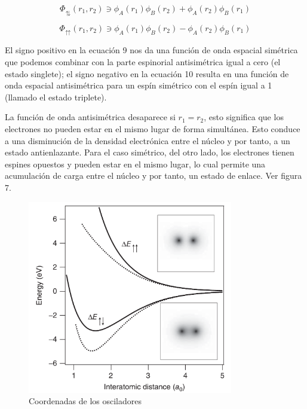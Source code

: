 \documentclass{article}
\begin{document}
\begin{equation}
    \Phi_{\updownarrows}(r_{1}, r_{2})\ni \phi_{A}(r_{1})\phi_{B}(r_{2}) + \phi_{A}(r_{2})\phi_{B}(r_{1})
\end{equation}

\begin{equation}
    \Phi_{\upuparrows}(r_{1}, r_{2})\ni \phi_{A}(r_{1})\phi_{B}(r_{2}) - \phi_{A}(r_{2})\phi_{B}(r_{1})
\end{equation}

El signo positivo en la ecuación 9 nos da una función de onda espacial simétrica que podemos combinar con la parte espinorial antisimétrica igual a cero (el estado singlete); el signo negativo en la ecuación 10 resulta en una función de onda espacial antisimétrica para un espín simétrico con el espín igual a 1 (llamado el estado triplete).

La función de onda antisimétrica desaparece si $r_{1} = r_{2}$, esto significa que los electrones no pueden estar en el mismo lugar de forma simultánea. Esto conduce a una disminución de la densidad electrónica entre el núcleo y por tanto, a un estado antienlazante. Para el caso simétrico, del otro lado, los electrones tienen espines opuestos y pueden estar en el mismo lugar, lo cual permite una acumulación de carga entre el núcleo y por tanto, un estado de enlace. Ver figura 7.

\begin{figure}[h]
    \centering
    \includegraphics[width=0.8\textwidth]{Enlace_Covalente_2.png}
    \caption{Coordenadas de los osciladores}
    \label{Figura 1}
\end{figure}
\end{document}
